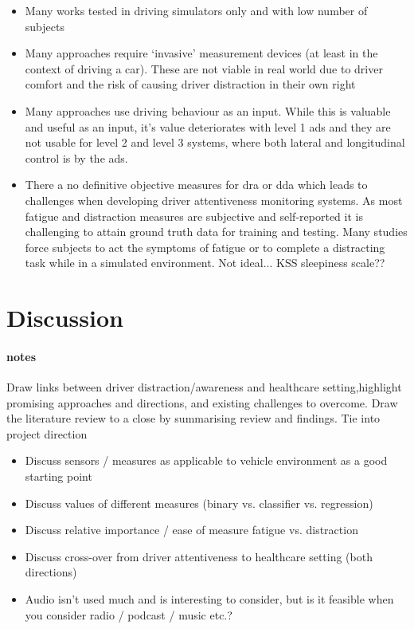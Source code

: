\documentclass[11pt, parskip=half*,twoside=false]{scrbook}
\begin{document}
\begin{itemize}
	\item Many works tested in driving simulators only and with low number of subjects
	\item Many approaches require `invasive' measurement devices (at least in the context of driving a car). These are not viable in real world due to driver comfort and the risk of causing driver distraction in their own right
	\item Many approaches use driving behaviour as an input. While this is valuable and useful as an input, it's value deteriorates with level 1 \gls{ads} and they are not usable for level 2 and level 3 systems, where both lateral and longitudinal control is by the \gls{ads}.
	\item There a no definitive objective measures for \gls{dra} or \gls{dda} which leads to challenges when developing driver attentiveness monitoring systems. As most fatigue and distraction measures are subjective and self-reported it is challenging to attain ground truth data for training and testing. Many studies force subjects to act the symptoms of fatigue or to complete a distracting task while in a simulated environment. Not ideal...  \citep{kaidaValidationKarolinskaSleepiness2006} KSS sleepiness scale??
\end{itemize}

\section{Discussion}
\paragraph{notes}
Draw links between driver distraction/awareness and healthcare setting,highlight promising approaches and directions, and existing challenges to overcome. Draw the literature review to a close by summarising review and findings. Tie into project direction

\begin{itemize}
	\item Discuss sensors / measures as applicable to vehicle environment \citep{crayeMultiModalDriverFatigue2016} as a good starting point
	\item Discuss values of different measures (binary vs. classifier vs. regression)
	\item Discuss relative importance / ease of measure fatigue vs. distraction
	\item Discuss cross-over from driver attentiveness to healthcare setting (both directions)
	\item Audio isn't used much and is interesting to consider, but is it feasible when you consider radio / podcast / music etc.?
\end{itemize}
\end{document}
